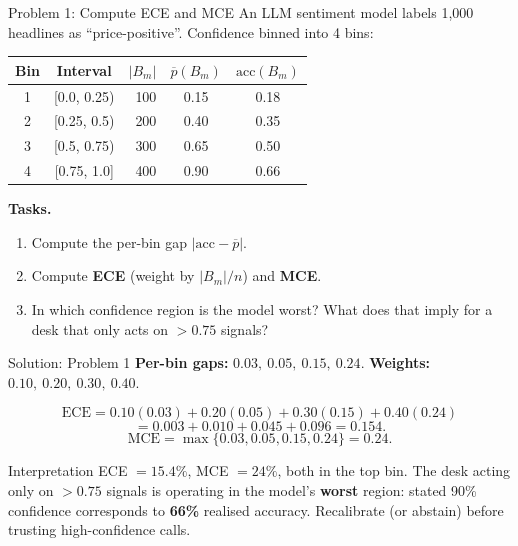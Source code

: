 \documentclass[9pt,t]{beamer}
\begin{document}
\begin{frame}{Problem 1: Compute ECE and MCE}
An LLM sentiment model labels 1{,}000 headlines as ``price-positive''. Confidence
binned into 4 bins:

\medskip
\centering
\begin{tabular}{ccrcc}
\toprule
Bin & Interval & $|B_m|$ & $\overline{p}(B_m)$ & $\text{acc}(B_m)$ \\
\midrule
1 & [0.0, 0.25) & 100 & 0.15 & 0.18 \\
2 & [0.25, 0.5) & 200 & 0.40 & 0.35 \\
3 & [0.5, 0.75) & 300 & 0.65 & 0.50 \\
4 & [0.75, 1.0] & 400 & 0.90 & 0.66 \\
\bottomrule
\end{tabular}

\medskip
\raggedright
\textbf{Tasks.}
\begin{enumerate}
  \item Compute the per-bin gap $|\text{acc}-\overline{p}|$.
  \item Compute \textbf{ECE} (weight by $|B_m|/n$) and \textbf{MCE}.
  \item In which confidence region is the model worst? What does that imply for a
        desk that only acts on $>0.75$ signals?
\end{enumerate}
\end{frame}

\begin{frame}{Solution: Problem 1}
\textbf{Per-bin gaps:} $0.03,\ 0.05,\ 0.15,\ 0.24$. \quad
\textbf{Weights:} $0.10,\ 0.20,\ 0.30,\ 0.40$.

\medskip
\[
  \text{ECE} = 0.10(0.03)+0.20(0.05)+0.30(0.15)+0.40(0.24)
\]
\[
  = 0.003 + 0.010 + 0.045 + 0.096 = \mathbf{0.154}.
\]
\[
  \text{MCE} = \max\{0.03,0.05,0.15,0.24\} = \mathbf{0.24}.
\]

\medskip
\begin{alertblock}{Interpretation}
ECE $=15.4\%$, MCE $=24\%$, both in the top bin. The desk acting only on
$>0.75$ signals is operating in the model's \textbf{worst} region: stated 90\%
confidence corresponds to \textbf{66\%} realised accuracy. Recalibrate (or
abstain) before trusting high-confidence calls.
\end{alertblock}
\end{frame}
\end{document}
